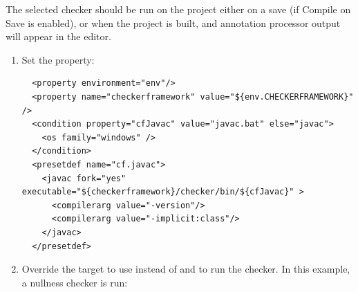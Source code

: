 The selected checker should be run on the project either on a save (if
Compile on Save is enabled), or when the project is built, and
annotation processor output will appear in the editor.



\begin{enumerate}
\item
Set the  property:

\begin{smaller}
\begin{Verbatim}
  <property environment="env"/>
  <property name="checkerframework" value="${env.CHECKERFRAMEWORK}" />
  <condition property="cfJavac" value="javac.bat" else="javac">
    <os family="windows" />
  </condition>
  <presetdef name="cf.javac">
    <javac fork="yes" executable="${checkerframework}/checker/bin/${cfJavac}" >
      <compilerarg value="-version"/>
      <compilerarg value="-implicit:class"/>
    </javac>
  </presetdef>
\end{Verbatim}
\end{smaller}

\item
Override the  target to
use  instead of  and to run the checker.
In this example, a nullness checker is run:


\end{enumerate}
